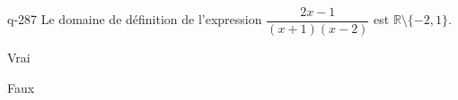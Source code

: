 \begin{truefalse}{q-287}
Le domaine de définition de l'expression $\dfrac{2x-1}{(x+1)(x-2)}$ est $\mathbb R \setminus \{-2,1\}$.
\item Vrai
\item* Faux
\end{truefalse}

